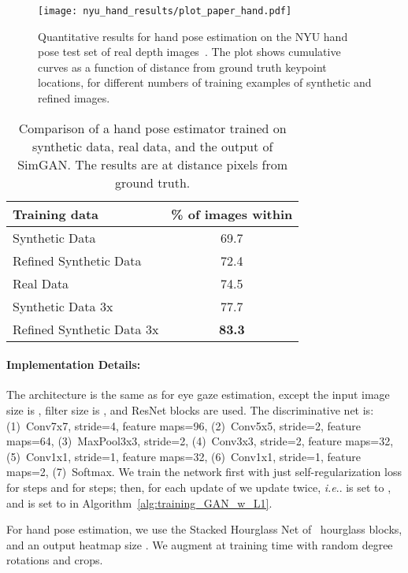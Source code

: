 \documentclass[10pt,twocolumn,letterpaper]{article}
\makeatletter
\DeclareRobustCommand\onedot{\futurelet\@let@token\@onedot}
\def\@onedot{\ifx\@let@token.\else.\null\fi\xspace}
\def\ie{\emph{i.e}\onedot} \def\Ie{\emph{I.e}\onedot}
\makeatother
\begin{document}
\begin{figure}
\centering
\vspace{-0.2cm}
\texttt{[image: nyu\_hand\_results/plot\_paper\_hand.pdf]}
\vspace{-0.6cm}
\caption{Quantitative results for hand pose estimation on the NYU hand pose test set of real depth images~\cite{tompson14NYU}.
The plot shows cumulative curves as a function of distance from ground truth keypoint locations, for different numbers of training examples of synthetic and refined images.
}
\label{fig:handpose_result_quantitative}
\end{figure}




\begin{table}
\centering
\begin{tabular}{|l|c|} \hline
Training data  & \% of images within   \\ \hline 
Synthetic Data & 69.7 \\
Refined Synthetic Data & 72.4 \\
Real Data & 74.5 \\
Synthetic Data 3x & 77.7 \\
Refined Synthetic Data 3x & {\bf 83.3} \\
\hline
\end{tabular}
\caption{Comparison of a hand pose estimator trained on synthetic data, real data, and the output of SimGAN.
The results are at distance  pixels from ground truth.
}
\label{tab:handpose_result_table}
\end{table}

\vspace{-0.1in}
\paragraph{Implementation Details:}
The architecture is the same as for eye gaze estimation, except the input image size is , filter size is , and  ResNet blocks are used.
The discriminative net  is:
(1)~Conv7x7, stride=4, feature maps=96, 
(2)~Conv5x5, stride=2, feature maps=64, 
(3)~MaxPool3x3, stride=2, 
(4)~Conv3x3, stride=2, feature maps=32,  
(5)~Conv1x1, stride=1, feature maps=32,  
(6)~Conv1x1, stride=1, feature maps=2,  
(7)~Softmax. 
We train the  network first with just  self-regularization loss for  steps and  for  steps; then, for each update of  we update  twice, \ie  is set to , and  is set to  in Algorithm~\ref{alg:training_GAN_w_L1}.

For hand pose estimation, we use the Stacked Hourglass Net of~\cite{Newell16}  hourglass blocks, and an output heatmap size . 
We augment at training time with random  degree rotations and crops. 
\end{document}
